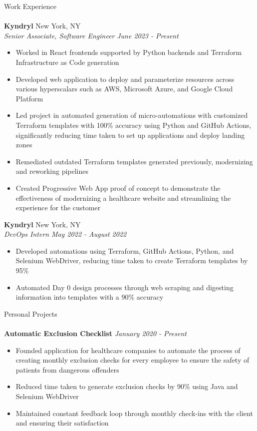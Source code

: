 \documentclass[10pt]{article}
\newcommand{\lineunder} {
    \vspace*{-8pt} \\
    \hspace*{-18pt} \hrulefill \\
}
\newcommand{\header}[1]{
    {\hspace*{-18pt}\vspace*{6pt} #1}
    \vspace*{-6pt} \lineunder
}
\begin{document}
\header{Work Experience}
\textbf{Kyndryl} \hfill New York, NY\\
\textit{Senior Associate, Software Engineer} \hfill \textit{June 2023 - Present}\\
\vspace{-2mm}
\begin{itemize}[noitemsep,parsep=0pt,partopsep=0pt]\itemsep 1pt
    \item Worked in React frontends supported by Python backends and Terraform Infrastructure as Code generation
    \item Developed web application to deploy and parameterize resources across various hyperscalars such as AWS, Microsoft Azure, and Google Cloud Platform
    \item Led project in automated generation of micro-automations with customized Terraform templates with 100\% accuracy using Python and GitHub Actions, significantly reducing time taken to set up applications and deploy landing zones
    \item Remediated outdated Terraform templates generated previously, modernizing and reworking pipelines
    \item Created Progressive Web App proof of concept to demonstrate the effectiveness of modernizing a healthcare website and streamlining the experience for the customer
\end{itemize}
\vspace{-1mm}
\textbf{Kyndryl} \hfill New York, NY\\
\textit{DevOps Intern} \hfill \textit{May 2022 - August 2022}\\
\vspace{-2mm}
\begin{itemize}[noitemsep,parsep=0pt,partopsep=0pt]\itemsep 1pt
    \item Developed automations using Terraform, GitHub Actions, Python, and Selenium WebDriver, reducing time taken to create Terraform templates by 95\%
    \item Automated Day 0 design processes through web scraping and digesting information into templates with a 90\% accuracy
\end{itemize}

\vspace{2mm}
\header{Personal Projects}
{\textbf{Automatic Exclusion Checklist}} \hfill \textit{January 2020 - Present}
\begin{itemize}[noitemsep,topsep=0.5pt, parsep=0pt,partopsep=0pt]
    \item Founded application for healthcare companies to automate the process of creating monthly exclusion checks for every employee to ensure the safety of patients from dangerous offenders
    \item Reduced time taken to generate exclusion checks by 90\% using Java and Selenium WebDriver
    \item Maintained constant feedback loop through monthly check-ins with the client and ensuring their satisfaction
\end{itemize}
\end{document}
